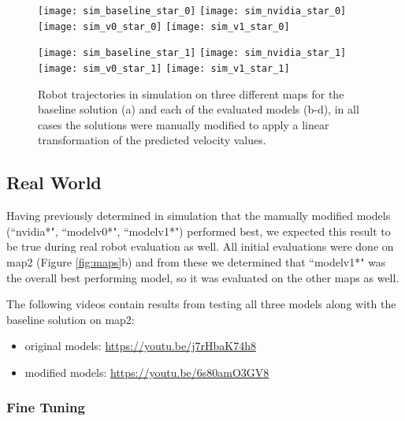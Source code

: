 \documentclass{article}
\begin{document}
\begin{figure}
    \centering
    \texttt{[image: sim\_baseline\_star\_0]}
    \texttt{[image: sim\_nvidia\_star\_0]}
    \texttt{[image: sim\_v0\_star\_0]}
    \texttt{[image: sim\_v1\_star\_0]}

    \texttt{[image: sim\_baseline\_star\_1]}
    \texttt{[image: sim\_nvidia\_star\_1]}
    \texttt{[image: sim\_v0\_star\_1]}
    \texttt{[image: sim\_v1\_star\_1]}

    \caption{Robot trajectories in simulation on three different maps for the baseline solution (a) and each of the evaluated models (b-d), in all cases the solutions were manually modified to apply a linear transformation of the predicted velocity values.}
  \label{fig:sim_results_modified}
\end{figure}

\subsection{Real World}

Having previously determined in simulation that the manually modified models (``nvidia*", ``modelv0*", ``modelv1*") performed best, we expected this result to be true during real robot evaluation as well. All initial evaluations were done on map2 (Figure \ref{fig:maps}b) and from these we determined that ``modelv1*" was the overall best performing model, so it was evaluated on the other maps as well.

The following videos contain results from testing all three models along with the baseline solution on map2:
\begin{itemize}
    \item original models: \url{https://youtu.be/j7rHbaK74h8}
    \item modified models: \url{https://youtu.be/6s80amO3GV8}
\end{itemize}

\subsubsection{Fine Tuning}
\end{document}
